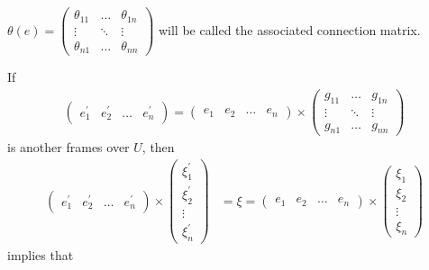 \documentclass[a4paper,10pt]{amsart}
\begin{document}
$\theta(e) =  \begin{pmatrix}
       \theta_{11} & \ldots & \theta_{1n}\\
       \vdots      & \ddots & \vdots \\
       \theta_{n1} & \ldots & \theta_{nn}
   \end{pmatrix}$ will be called the associated connection matrix.

If 
\begin{align*}
    \begin{pmatrix}
        e_{1}^{'} & e_{2}^{'} & \ldots & e_{n}^{'} 
    \end{pmatrix} =  
    \begin{pmatrix}
       e_1 & e_2 & \ldots & e_n 
    \end{pmatrix} \times
    \begin{pmatrix}
       g_{11} & \ldots & g_{1n}\\
       \vdots      & \ddots & \vdots \\
       g_{n1} & \ldots & g_{nn}
   \end{pmatrix}
\end{align*}
is another frames over $U$, then
\begin{align*}
   \begin{pmatrix}
        e_{1}^{'} & e_{2}^{'} & \ldots & e_{n}^{'} 
   \end{pmatrix} \times
   \begin{pmatrix}
       \xi_{1}^{'}\\
       \xi_{2}^{'}\\
       \vdots\\
       \xi_{n}^{'}
   \end{pmatrix} &= \xi = 
   \begin{pmatrix}
       e_1 & e_2 & \ldots & e_n 
   \end{pmatrix} \times
   \begin{pmatrix}
       \xi_1\\
       \xi_2\\
       \vdots\\
       \xi_n
   \end{pmatrix}
\end{align*}
implies that
\end{document}
